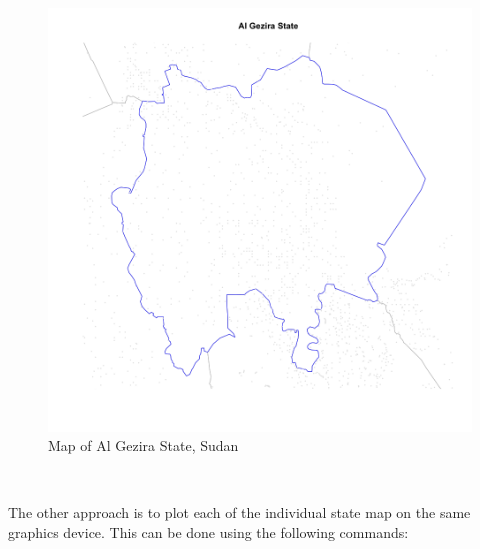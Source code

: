\documentclass[12pt,a4paper,a4paper]{book}
\theoremstyle{definition}
\theoremstyle{definition}
\theoremstyle{definition}
\theoremstyle{remark}
\begin{document}
~

\begin{figure}[H]

{\centering \includegraphics{figures/map14-1} 

}

\caption{Map of Al Gezira State, Sudan}\label{fig:map14}
\end{figure}

~

The other approach is to plot each of the individual state map on the
same graphics device. This can be done using the following commands:

~
\end{document}
